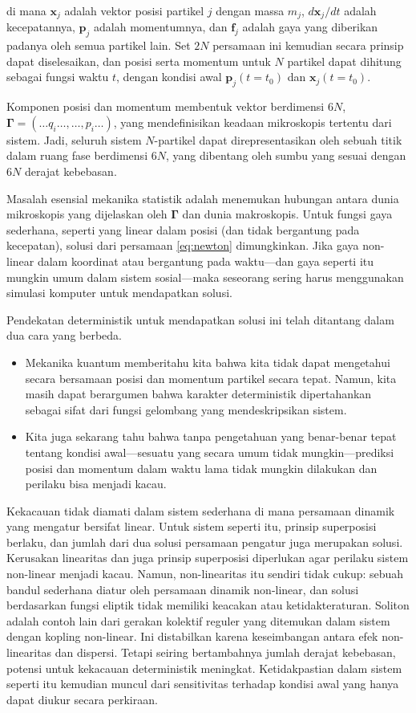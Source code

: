 \documentclass[a4paper,12pt]{book}
\begin{document}
di mana $\mathbf{x}_j$ adalah vektor posisi partikel $j$ dengan massa $m_j$, $d \mathbf{x}_j / dt$ adalah kecepatannya, $\mathbf{p}_j$ adalah momentumnya, dan $\mathbf{f}_j$ adalah gaya yang diberikan padanya oleh semua partikel lain. Set $2N$ persamaan ini kemudian secara prinsip dapat diselesaikan, dan posisi serta momentum untuk $N$ partikel dapat dihitung sebagai fungsi waktu $t$, dengan kondisi awal $\mathbf{p}_j(t=t_0)$ dan $\mathbf{x}_j(t=t_0)$.

Komponen posisi dan momentum membentuk vektor berdimensi $6N$, $\mathbf{\Gamma} = (\ldots q_i \ldots, \ldots, p_i \ldots)$, yang mendefinisikan keadaan mikroskopis tertentu dari sistem. Jadi, seluruh sistem $N$-partikel dapat direpresentasikan oleh sebuah titik dalam ruang fase berdimensi $6N$, yang dibentang oleh sumbu yang sesuai dengan $6N$ derajat kebebasan.

Masalah esensial mekanika statistik adalah menemukan hubungan antara dunia mikroskopis yang dijelaskan oleh $\mathbf{\Gamma}$ dan dunia makroskopis. Untuk fungsi gaya sederhana, seperti yang linear dalam posisi (dan tidak bergantung pada kecepatan), solusi dari persamaan \eqref{eq:newton} dimungkinkan. Jika gaya non-linear dalam koordinat atau bergantung pada waktu—dan gaya seperti itu mungkin umum dalam sistem sosial—maka seseorang sering harus menggunakan simulasi komputer untuk mendapatkan solusi.

Pendekatan deterministik untuk mendapatkan solusi ini telah ditantang dalam dua cara yang berbeda.

\begin{itemize}
\item Mekanika kuantum memberitahu kita bahwa kita tidak dapat mengetahui secara bersamaan posisi dan momentum partikel secara tepat. Namun, kita masih dapat berargumen bahwa karakter deterministik dipertahankan sebagai sifat dari fungsi gelombang yang mendeskripsikan sistem.
\item Kita juga sekarang tahu bahwa tanpa pengetahuan yang benar-benar tepat tentang kondisi awal—sesuatu yang secara umum tidak mungkin—prediksi posisi dan momentum dalam waktu lama tidak mungkin dilakukan dan perilaku bisa menjadi kacau.
\end{itemize}

Kekacauan tidak diamati dalam sistem sederhana di mana persamaan dinamik yang mengatur bersifat linear. Untuk sistem seperti itu, prinsip superposisi berlaku, dan jumlah dari dua solusi persamaan pengatur juga merupakan solusi. Kerusakan linearitas dan juga prinsip superposisi diperlukan agar perilaku sistem non-linear menjadi kacau. Namun, non-linearitas itu sendiri tidak cukup: sebuah bandul sederhana diatur oleh persamaan dinamik non-linear, dan solusi berdasarkan fungsi eliptik tidak memiliki keacakan atau ketidakteraturan. Soliton adalah contoh lain dari gerakan kolektif reguler yang ditemukan dalam sistem dengan kopling non-linear. Ini distabilkan karena keseimbangan antara efek non-linearitas dan dispersi. Tetapi seiring bertambahnya jumlah derajat kebebasan, potensi untuk kekacauan deterministik meningkat. Ketidakpastian dalam sistem seperti itu kemudian muncul dari sensitivitas terhadap kondisi awal yang hanya dapat diukur secara perkiraan.
\end{document}

